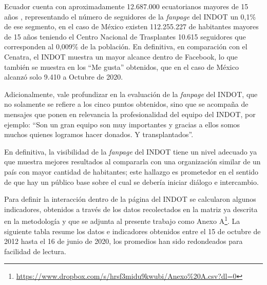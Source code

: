 \documentclass[spanish]{textolivre}
\begin{document}
Ecuador cuenta con aproximadamente 12.687.000 ecuatorianos mayores de 15 años \cite{inec2020}, representando el número de seguidores de la \emph{fanpage} del INDOT un 0,1\% de ese segmento, en el caso de México existen 112.255.227 de habitantes mayores de 15 años \cite{inegi2020} teniendo el Centro Nacional de Trasplantes 10.615 seguidores que corresponden al 0,009\% de la población. En definitiva, en comparación con el Cenatra, el INDOT muestra un mayor alcance dentro de Facebook, lo que también se muestra en los “Me gusta” obtenidos, que en el caso de México alcanzó solo 9.410 a Octubre de 2020.

Adicionalmente, vale profundizar en la evaluación de la \emph{fanpage} del INDOT, que no solamente se refiere a los cinco puntos obtenidos, sino que se acompaña de mensajes que ponen en relevancia la profesionalidad del equipo del INDOT, por ejemplo: “Son un gran equipo son muy importantes y gracias a ellos somos muchos quienes logramos hacer donados. Y transplantados”.

En definitiva, la visibilidad de la \emph{fanpage} del INDOT tiene un nivel adecuado ya que muestra mejores resultados al compararla con una organización similar de un país con mayor cantidad de habitantes; este hallazgo es prometedor en el sentido de que hay un público base sobre el cual se debería iniciar diálogo e intercambio.

Para definir la interacción dentro de la página del INDOT se calcularon algunos indicadores, obtenidos a través de los datos recolectados en la matriz ya descrita en la metodología y que se adjunta al presente trabajo como Anexo A\footnote{\url{https://www.dropbox.com/s/hrsf3midu9kwubi/Anexo\%20A.csv?dl=0}}. La siguiente tabla resume los datos e indicadores obtenidos entre el 15 de octubre de 2012 hasta el 16 de junio de 2020, los promedios han sido redondeados para facilidad de lectura. 
\end{document}
